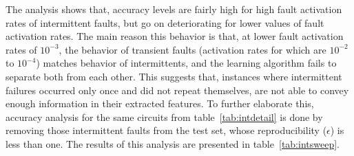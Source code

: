 The analysis shows that, accuracy levels are fairly high for high fault activation rates of intermittent faults, but go on deteriorating for lower values of fault activation rates. The main reason this behavior is that, at lower fault activation rates of $10^{-3}$, the behavior of transient faults (activation rates for which are $10^{-2}$ to $10^{-4}$) matches behavior of intermittents, and the learning algorithm fails to separate both from each other. This suggests that, instances where intermittent failures occurred only once and did not repeat themselves, are not able to convey enough information in their extracted features. To further elaborate this, accuracy analysis for the same circuits from table~\ref{tab:intdetail} is done by removing those intermittent faults from the test set, whose reproducibility ($\epsilon$) is less than one. The results of this analysis are presented in table~\ref{tab:intsweep}.

